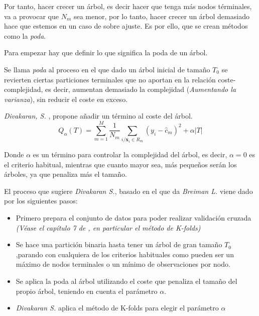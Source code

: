 \noindent Por tanto, hacer crecer un árbol, es decir hacer que tenga más nodos términales, va a provocar que $N_m$ sea menor, por lo tanto, hacer crecer un árbol demasiado hace que estemos en un caso de sobre ajuste. Es por ello, que se crean métodos como la \emph{poda}.

\noindent Para empezar hay que definir lo que significa la poda de un árbol. 
\begin{defi}
Se llama \emph{poda} al proceso en el que dado un árbol inicial de tamaño $T_0$ se revierten ciertas particiones terminales que no aportan en la relación coste-complejidad, es decir, aumentan demasiado la complejidad (\emph{Aumentando la varianza}), sin reducir el coste en exceso. 
\end{defi}


\noindent \emph{Divakaran, S. }\cite{Divakaran 2022}, propone añadir un término al coste del árbol. 
\begin{equation}
Q_{\alpha}(T)=\sum_{m=1}^M\frac{1}{N_m}\sum_{i/\mathbf{x}_i\in R_m} (y_i-\hat{c}_m)^2+\alpha|T |
\end{equation}

\noindent Donde $\alpha$ es un término para controlar la complejidad del árbol, es decir, $\alpha=0$ es el criterio habitual, mientras que cuanto mayor sea, más pequeños serán los árboles, ya que penaliza más el tamaño.  

\noindent El proceso que sugiere \emph{Divakaran S.}\cite{Divakaran 2022}, basado en el que da \emph{Breiman L.}\cite{Breiman 1984} viene dado por los siguientes pasos:
\begin{itemize}
\item Primero prepara el conjunto de datos para poder realizar validación cruzada \emph{(Véase el capítulo 7 de \cite{Hastie 2001}, en particular el método de K-folds)}
\item Se hace una partición binaria hasta tener un árbol de gran tamaño $T_0$,parando con cualquiera de los criterios habituales como pueden ser un máximo de nodos terminales o un mínimo de observaciones por nodo. 

\item Se aplica la poda al árbol utilizando el coste que penaliza el tamaño del propio árbol, teniendo en cuenta el parámetro $\alpha$. 

\item \emph{Divakaran S.}\cite{Divakaran 2022} aplica el método de K-folds para elegir el parámetro $\alpha$
\end{itemize}

